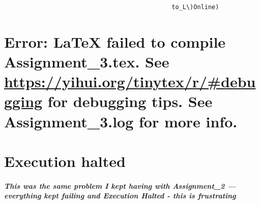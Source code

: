 \documentclass[
]{article}
\begin{document}
\begin{verbatim}
                                              to_L\)Online) 
\end{verbatim}

\hypertarget{error-latex-failed-to-compile-assignment_3.tex.-see-httpsyihui.orgtinytexrdebugging-for-debugging-tips.-see-assignment_3.log-for-more-info.}{%
\section{\texorpdfstring{Error: LaTeX failed to compile
Assignment\_3.tex. See \url{https://yihui.org/tinytex/r/\#debugging} for
debugging tips. See Assignment\_3.log for more
info.}{Error: LaTeX failed to compile Assignment\_3.tex. See https://yihui.org/tinytex/r/\#debugging for debugging tips. See Assignment\_3.log for more info.}}\label{error-latex-failed-to-compile-assignment_3.tex.-see-httpsyihui.orgtinytexrdebugging-for-debugging-tips.-see-assignment_3.log-for-more-info.}}

\hypertarget{execution-halted}{%
\section{Execution halted}\label{execution-halted}}

\hypertarget{this-was-the-same-problem-i-kept-having-with-assignment_2-everything-kept-failing-and-execution-halted---this-is-frustrating}{%
\subparagraph{This was the same problem I kept having with Assignment\_2
--- everything kept failing and Execution Halted - this is
frustrating}\label{this-was-the-same-problem-i-kept-having-with-assignment_2-everything-kept-failing-and-execution-halted---this-is-frustrating}}
\end{document}
